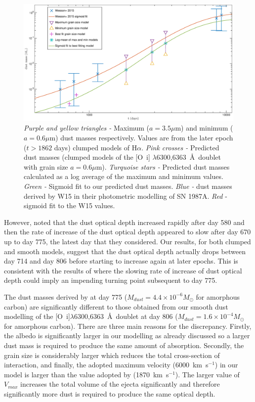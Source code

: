 \documentclass[useAMS,usenatbib,usegraphicx]{mnras}
\begin{document}
\begin{figure}
\begin{center}
\includegraphics[trim =120 30 105 15,clip=true,scale=0.41]{Mdust_evol2}
\caption{\textit{Purple and yellow triangles -} Maximum ($a=3.5\mu$m) and 
minimum ($a=0.6\mu$m) dust masses respectively.  Values are from the 
later epoch ($t>1862$ days) clumped models of H$\alpha$.  \textit{Pink 
crosses - } Predicted dust masses (clumped models of the 
[O~{\sc i}] $\lambda$6300,6363~\AA\ doublet with grain size $a=0.6\mu$m).  
\textit{Turquoise stars -} Predicted dust masses calculated as a log 
average of the maximum and minimum values.  \textit{Green -} Sigmoid fit 
to our predicted dust masses. \textit{Blue - } dust masses derived by W15 
in their photometric modelling of SN 1987A. \textit{Red} - sigmoid fit to 
the W15 values.}
\label{Mdust}
\end{center}
\end{figure}

However, \citet{Lucy1989} noted that the dust optical depth increased rapidly after day 580 and then the rate of increase of the dust optical depth appeared to slow after day 670 up to day 775, the latest day that they considered.  Our results, for both clumped and smooth models, suggest that the dust optical depth actually drops between day 714 and day 806 before starting to increase again at later epochs.  This is consistent with the results of \citet{Lucy1989} where the slowing rate of increase of dust optical depth could imply an impending turning point subsequent to day 775.  

The dust masses derived by \citet{Lucy1989} at day 775 ($M_{dust}=4.4 \times 10^{-6} M_{\odot}$ for amorphous carbon) are significantly different to those obtained from our smooth dust modelling of the [O~{\sc i}]$\lambda$6300,6363~\AA\ doublet at day 806 ($M_{dust}=1.6 \times 10^{-4} M_{\odot}$ for amorphous carbon).  There are three main reasons for the discrepancy.  Firstly, the albedo is significantly larger in our modelling as already discussed so a larger dust mass is required to produce the same amount of absorption.  Secondly, the grain size is considerably larger which reduces the total cross-section of interaction, and finally, the adopted maximum velocity (6000~km~s$^{-1}$) in our model is larger than the value adopted by \citet{Lucy1989} (1870~km~s$^{-1}$).  The larger value of $V_{max}$ increases the total volume of the ejecta significantly and therefore significantly more dust is required to produce the same optical depth.
\end{document}
